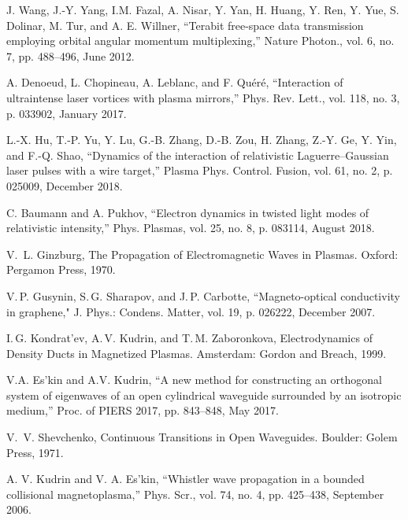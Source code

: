 \documentclass[conference,a4paper]{IEEEtran}
\begin{document}
\begin{thebibliography}{00}
 J. Wang, J.-Y. Yang, I.M. Fazal, A. Nisar, Y. Yan, H. Huang, Y. Ren, Y. Yue, S. Dolinar, M. Tur, and A. E. Willner, ``Terabit free-space data transmission employing orbital angular momentum multiplexing,'' Nature Photon., vol. 6, no. 7, pp. 488--496, June 2012.

 A. Denoeud, L. Chopineau, A. Leblanc, and F. Qu\'{e}r\'{e}, ``Interaction of ultraintense laser vortices with plasma mirrors,'' Phys. Rev. Lett., vol. 118, no. 3, p. 033902, January 2017.

 L.-X. Hu, T.-P. Yu, Y. Lu, G.-B. Zhang, D.-B. Zou, H. Zhang, Z.-Y. Ge, Y. Yin, and F.-Q. Shao, ``Dynamics of the interaction of relativistic Laguerre--Gaussian laser pulses with a wire target,'' Plasma Phys. Control. Fusion, vol. 61, no. 2, p. 025009, December 2018.

 C. Baumann and A. Pukhov, ``Electron dynamics in twisted light modes of relativistic intensity,'' Phys. Plasmas, vol. 25, no. 8, p. 083114, August 2018.

V.~L. Ginzburg, The Propagation of Electromagnetic Waves in Plasmas. Oxford: Pergamon Press, 1970.

V.\,P. Gusynin, S.\,G. Sharapov, and J.\,P. Carbotte, ``Magneto-optical conductivity in graphene," { J. Phys.: Condens. Matter}, vol. 19, p. 026222, December 2007.

 I.\,G. Kondrat'ev, A.\,V. Kudrin, and T.\,M. Zaboronkova, Electrodynamics of Density Ducts in Magnetized Plasmas. Amsterdam: Gordon and Breach, 1999.

 V.A. Es'kin and A.V. Kudrin, ``A new method for constructing an orthogonal system of eigenwaves of an open cylindrical waveguide surrounded by an isotropic medium,'' Proc. of PIERS 2017, pp. 843--848, May 2017.

 V.~V. Shevchenko, Continuous Transitions in Open Waveguides. Boulder: Golem Press, 1971.

A. V. Kudrin and V. A. Es'kin, ``Whistler wave propagation in a bounded collisional magnetoplasma,'' Phys. Scr., vol. 74, no. 4, pp. 425--438, September 2006.


\end{thebibliography}
\end{document}
